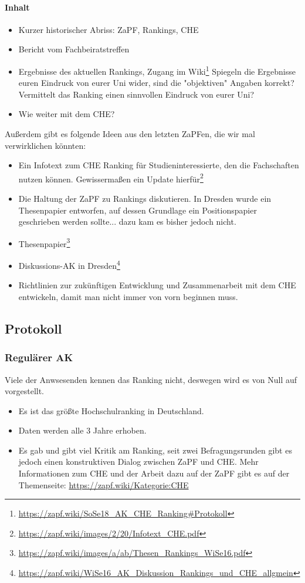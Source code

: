     \paragraph{Inhalt}
      \begin{itemize}
        \item Kurzer historischer Abriss: ZaPF, Rankings, CHE
        \item Bericht vom Fachbeiratstreffen
        \item Ergebnisse des aktuellen Rankings, Zugang im Wiki\footnote{\url{https://zapf.wiki/SoSe18_AK_CHE_Ranking\#Protokoll}}
        Spiegeln die Ergebnisse euren Eindruck von eurer Uni wider, sind die "objektiven" Angaben korrekt?
        Vermittelt das Ranking einen sinnvollen Eindruck von eurer Uni?
        \item Wie weiter mit dem CHE?
      \end{itemize}
      Außerdem gibt es folgende Ideen aus den letzten ZaPFen, die wir mal verwirklichen könnten:
      \begin{itemize}
        \item Ein Infotext zum CHE Ranking für Studieninteressierte, den die Fachschaften nutzen können. Gewissermaßen ein Update hierfür\footnote{\url{https://zapf.wiki/images/2/20/Infotext_CHE.pdf}}
        \item Die Haltung der ZaPF zu Rankings diskutieren. In Dresden wurde ein Thesenpapier entworfen, auf dessen Grundlage ein Positionspapier geschrieben werden sollte... dazu kam es bisher jedoch nicht.
        \item Thesenpapier\footnote{\url{https://zapf.wiki/images/a/ab/Thesen_Rankings_WiSe16.pdf}}
        \item Diskussions-AK in Dresden\footnote{\url{https://zapf.wiki/WiSe16_AK_Diskussion_Rankings_und_CHE_allgmein}}
        \item Richtlinien zur zukünftigen Entwicklung und Zusammenarbeit mit dem CHE entwickeln, damit man nicht immer von vorn beginnen muss.
      \end{itemize}

  \subsection*{Protokoll}
    \subsubsection*{Regulärer AK}
      Viele der Anwsesenden kennen das Ranking nicht, deswegen wird es von Null auf vorgestellt.
        \begin{itemize}
          \item Es ist das größte Hochschulranking in Deutschland.
          \item Daten werden alle 3 Jahre erhoben.
          \item Es gab und gibt viel Kritik am Ranking, seit zwei Befragungsrunden gibt es jedoch einen konstruktiven Dialog zwischen ZaPF und CHE. Mehr Informationen zum CHE und der Arbeit dazu auf der ZaPF gibt es auf der Themenseite: \url{https://zapf.wiki/Kategorie:CHE}
        \end{itemize}

